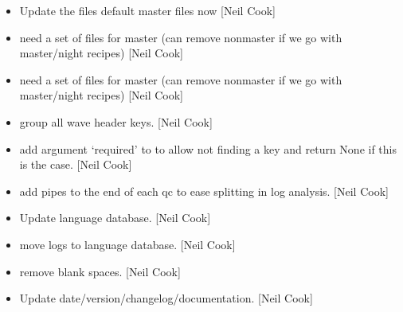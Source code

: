 \documentclass[a4paper,10pt,english]{report}
\begin{document}
\begin{itemize}
\item {} 
Update the  files \sphinxhyphen{} default master files now
 {[}Neil Cook{]}

\item {} 
 \sphinxhyphen{} need a set of files
for master (can remove non\sphinxhyphen{}master if we go with master/night recipes)
{[}Neil Cook{]}

\item {} 
 \sphinxhyphen{} need a set of files for
master (can remove non\sphinxhyphen{}master if we go with master/night recipes)
{[}Neil Cook{]}

\item {} 
 \sphinxhyphen{} group all wave header
keys. {[}Neil Cook{]}

\item {} 
 \sphinxhyphen{} add argument ‘required’ to
 to allow not finding a key and return None if this
is the case. {[}Neil Cook{]}

\item {} 
 \sphinxhyphen{} add pipes to the end of each qc to ease
splitting in log analysis. {[}Neil Cook{]}

\item {} 
Update language database. {[}Neil Cook{]}

\item {} 
 \sphinxhyphen{} move logs to language database. {[}Neil Cook{]}

\item {} 
 \sphinxhyphen{} remove blank spaces. {[}Neil Cook{]}

\item {} 
Update date/version/changelog/documentation. {[}Neil Cook{]}

\end{itemize}
\end{document}
